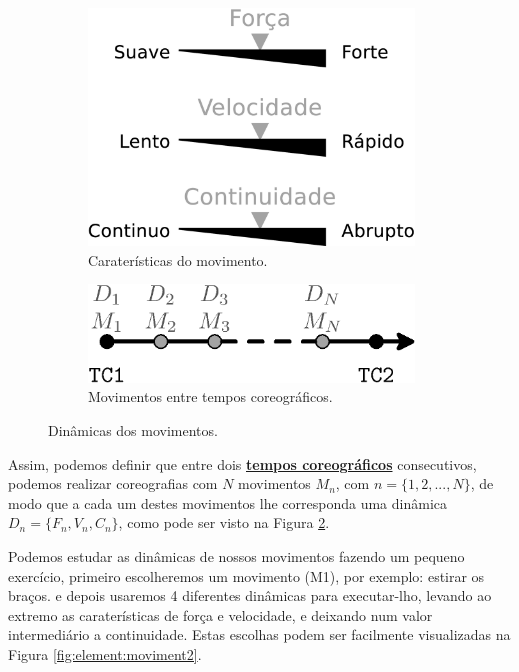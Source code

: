 \begin{figure}[!h]
\centering
    \begin{subfigure}[b]{0.45\textwidth}
    \centering
    \includegraphics[width=0.95\textwidth]{chapters/cap-musicalidade/dinamicas-elementos1.eps}
    \caption{Caraterísticas do movimento.}
    \label{fig:element:moviment}
    \end{subfigure}
    \hfill
    \begin{subfigure}[b]{0.5\textwidth}
    \centering
    \includegraphics[width=0.95\textwidth]{chapters/cap-musicalidade/dinamicas-elementos1b.eps}
    \caption{Movimentos entre tempos coreográficos.}
    \label{fig:coreografia:moviment}
    \end{subfigure}
\caption{Dinâmicas dos movimentos.}
\label{fig:geral:moviment}
\end{figure}
Assim, podemos definir que entre dois \hyperref[sec:TemposCoreograficos]{\textbf{tempos coreográficos}} consecutivos,
podemos realizar coreografias com $N$ movimentos $M_n$, com $n=\{1, 2, ..., N\}$, 
de modo que a cada um destes movimentos lhe corresponda uma dinâmica $D_n=\{F_n, V_n, C_n\}$,
como pode ser visto na Figura \ref{fig:coreografia:moviment}.
\begin{example}
Podemos estudar as dinâmicas de nossos movimentos fazendo um pequeno exercício,
primeiro escolheremos um movimento (M1), por exemplo: estirar os braços.
e depois usaremos 4 diferentes dinâmicas para executar-lho,
levando ao extremo as caraterísticas de força e velocidade,
e deixando num valor intermediário a continuidade.
Estas escolhas podem ser facilmente visualizadas na Figura \ref{fig:element:moviment2}.
\end{example}



